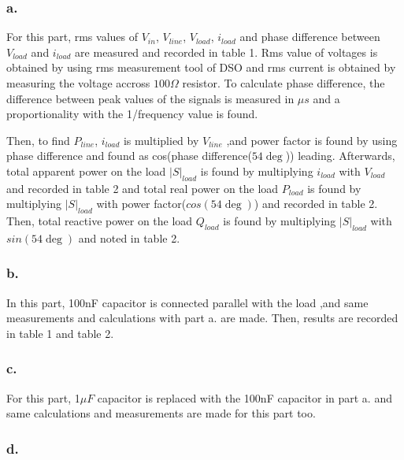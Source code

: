 \documentclass[letterpaper,12pt]{article}
\begin{document}
\subsubsection{a.}
For this part, rms values of \(V_{in}\), \(V_{line}\), \(V_{load}\), \(i_{load}\) and phase difference between \(V_{load}\) and \(i_{load}\) are measured and recorded in table 1. Rms value of voltages is obtained by using rms measurement tool of DSO and rms current is obtained by measuring the voltage accross \(100\Omega\) resistor. To calculate phase difference, the difference between peak values of the signals is measured in \(\mu s\) and a proportionality with the 1/frequency value is found.


Then, to find \(P_{line}\), \(i_{load}\) is multiplied by \(V_{line}\) ,and power factor is found by using phase difference and found as cos(phase difference(\(54\deg \))) leading. Afterwards, total apparent power on the load \(|S|_{load}\) is found by multiplying \(i_{load}\) with \(V_{load}\) and recorded in table 2 and total real power on the load \(P_{load}\) is found by multiplying \(|S|_{load}\) with power factor(\(cos(54\deg )\)) and recorded in table 2. Then, total reactive power on the load \(Q_{load}\) is found by multiplying \(|S|_{load}\) with \(sin(54\deg )\) and noted in table 2.
\subsubsection{b.}
In this part, 100nF capacitor is connected parallel with the load ,and same measurements and calculations with part a. are made. Then, results are recorded in table 1 and table 2.   
\subsubsection{c.}
For this part, 1\(\mu F\) capacitor is replaced with the 100nF capacitor in part a. and same calculations and measurements are made for this part too.
\subsubsection{d.}
\end{document}
